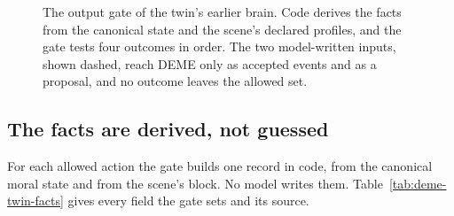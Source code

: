 \begin{figure}[t]
\centering

\caption{The output gate of the twin's earlier brain. Code derives the facts from the canonical state and the scene's
declared profiles, and the gate tests four outcomes in order. The two model-written inputs, shown
dashed, reach DEME only as accepted events and as a proposal, and no outcome leaves the allowed
set.}
\label{fig:deme-twin-gate}
\end{figure}

\subsection{The facts are derived, not guessed}

For each allowed action the gate builds one  record in code, from the
canonical moral state and from the scene's  block. No model writes
them. Table~\ref{tab:deme-twin-facts} gives every field the gate sets and its source.

